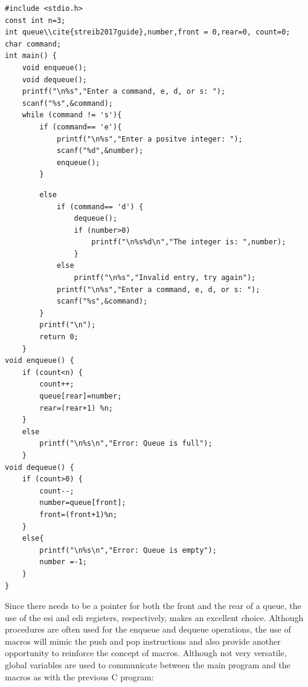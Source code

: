 \documentclass[10pt]{book}
\begin{document}
\begin{verbatim}
#include <stdio.h>
const int n=3;
int queue\\cite{streib2017guide},number,front = 0,rear=0, count=0;
char command;
int main() {
    void enqueue();
    void dequeue();
    printf("\n%s","Enter a command, e, d, or s: ");
    scanf("%s",&command);
    while (command != 's'){
        if (command== 'e'){
            printf("\n%s","Enter a positve integer: ");
            scanf("%d",&number);
            enqueue();
        }
\end{verbatim}

\begin{verbatim}
        else
            if (command== 'd') {
                dequeue();
                if (number>0)
                    printf("\n%s%d\n","The integer is: ",number);
                }
            else
                printf("\n%s","Invalid entry, try again");
            printf("\n%s","Enter a command, e, d, or s: ");
            scanf("%s",&command);
        }
        printf("\n");
        return 0;
    }
void enqueue() {
    if (count<n) {
        count++;
        queue[rear]=number;
        rear=(rear+1) %n;
    }
    else
        printf("\n%s\n","Error: Queue is full");
    }
void dequeue() {
    if (count>0) {
        count--;
        number=queue[front];
        front=(front+1)%n;
    }
    else{
        printf("\n%s\n","Error: Queue is empty");
        number =-1;
    }
}
\end{verbatim}

Since there needs to be a pointer for both the front and the rear of a queue, the use of the esi and edi registers, respectively, makes an excellent choice. Although procedures are often used for the enqueue and dequeue operations, the use of macros will mimic the push and pop instructions and also provide another opportunity to reinforce the concept of macros. Although not very versatile, global variables are used to communicate between the main program and the macros as with the previous C program:
\end{document}
